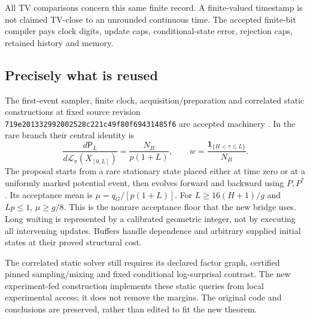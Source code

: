 \documentclass[10pt,a4paper]{article}
\newcommand{\one}{\mathbf 1}
\newcommand{\Law}{\mathcal L}
\begin{document}
All TV comparisons concern this same finite record. A finite-valued
timestamp is not claimed TV-close to an unrounded continuous time.
The accepted finite-bit compiler pays clock digits, update caps,
conditional-state error, rejection caps, retained history and memory.

\subsection{Precisely what is reused}
The first-event sampler, finite clock, acquisition/preparation and
correlated static constructions at fixed source revision
\texttt{719e201332992002528c221c49f80f69431485f6} are accepted machinery
\cite{governing}. In the rare branch their central identity is
\begin{equation}
\frac{d\mathsf P_L}{d\Law_\pi(X_{[0,L]})}
=\frac{N_B}{p(1+L)},\qquad
w=\frac{\one_{\{H<\tau\le L\}}}{N_B}.
\label{eq:palmBaseline}
\end{equation}
The proposal starts from a rare stationary state placed either at time
zero or at a uniformly marked potential event, then evolves forward and
backward using $P,P^*$. Its acceptance mean is
$\mu=q_G/[p(1+L)]$. For $L\ge16(H+1)/g$ and $Lp\le1$,
$\mu\ge g/8$. This is the nonrare acceptance floor that the new bridge
uses. Long waiting is represented by a calibrated geometric integer,
not by executing all intervening updates. Buffers handle dependence
and arbitrary supplied initial states at their proved structural cost.

The correlated static solver still requires its declared factor graph,
certified pinned sampling/mixing and fixed conditional log-surprisal
contrast. The new experiment-fed construction implements these static
queries from local experimental access; it does not remove the margins.
The original code and conclusions are preserved, rather than edited to
fit the new theorem.






\end{document}
